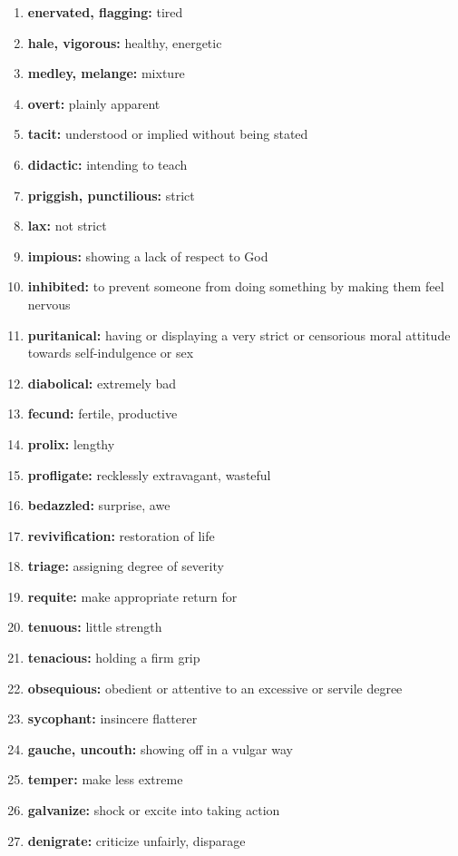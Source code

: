 \documentclass{article}
\begin{document}
\begin{enumerate}
    \item \textbf{enervated, flagging: }{tired}
    \item \textbf{hale, vigorous: }{healthy, energetic}
    \item \textbf{medley, melange: }{mixture}
    \item \textbf{overt: }{plainly apparent}
    \item \textbf{tacit: }{understood or implied without being stated}
    \item \textbf{didactic: }{intending to teach}
    \item \textbf{priggish, punctilious: }{strict}
    \item \textbf{lax: }{not strict}
    \item \textbf{impious: }{showing a lack of respect to God}
    \item \textbf{inhibited: }{to prevent someone from doing something by making them feel nervous}
    \item \textbf{puritanical: }{having or displaying a very strict or censorious moral attitude towards self-indulgence or sex}
    \item \textbf{diabolical: }{extremely bad}
    \item \textbf{fecund: }{fertile, productive}
    \item \textbf{prolix: }{lengthy}
    \item \textbf{profligate: }{recklessly extravagant, wasteful}
    \item \textbf{bedazzled: }{surprise, awe}
    \item \textbf{revivification: }{restoration of life}
    \item \textbf{triage: }{assigning degree of severity}
    \item \textbf{requite: }{make appropriate return for}
    \item \textbf{tenuous: }{little strength}
    \item \textbf{tenacious: }{holding a firm grip}
    \item \textbf{obsequious: }{obedient or attentive to an excessive or servile degree}
    \item \textbf{sycophant: }{insincere flatterer}
    \item \textbf{gauche, uncouth: }{showing off in a vulgar way}
    \item \textbf{temper: }{make less extreme}
    \item \textbf{galvanize: }{shock or excite into taking action}
    \item \textbf{denigrate: }{criticize unfairly, disparage}

\end{enumerate}
\end{document}
